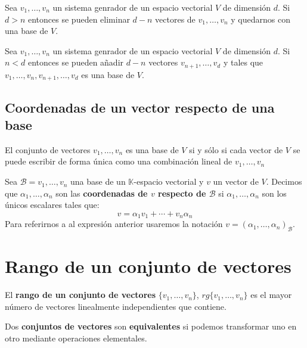 \begin{theorem}
	Sea ${v_1,\ldots,v_n}$ un sistema genrador de un espacio vectorial $V$ de dimensión $d$. Si $d>n$ entonces se pueden eliminar $d-n$ vectores de ${v_1,\ldots,v_n}$ y quedarnos con una base de $V$.
\end{theorem}

\begin{theorem}
	Sea ${v_1,\ldots,v_n}$ un sistema genrador de un espacio vectorial $V$ de dimensión $d$. Si $n<d$ entonces se pueden añadir $d-n$ vectores ${v_{n+1},\ldots,v_d}$ y tales que ${v_1,\ldots,v_n,v_{n+1},\ldots,v_d}$ es una base de $V$.
\end{theorem}

\subsection{Coordenadas de un vector respecto de una base}

\begin{theorem}
	El conjunto de vectores ${v_{1},\ldots,v_n}$ es una base de $V$ si y sólo si cada vector de $V$ se puede escribir de forma única como una combinación lineal de ${v_{1},\ldots,v_n}$
\end{theorem}

\begin{defi}
	Sea $\mathcal{B}={v_{1},\ldots,v_n}$ una base de un $\mathbb{K}$-espacio vectorial y $v$ un vector de $V$. Decimos que ${\alpha_{1},\ldots,\alpha_n}$ son las \textbf{coordenadas de $v$ respecto de $\mathcal{B}$} si $\alpha_{1},\ldots,\alpha_n$ son los únicos escalares tales que:
	\[
	v = \alpha_{1}v_1+\cdots+v_n\alpha_n
	\]
	Para referirnos a al expresión anterior usaremos la notación $v=(\alpha_{1},\ldots,\alpha_n)_{\mathcal{B}}$.
\end{defi}

\section{Rango de un conjunto de vectores}

\begin{defi}
	El \textbf{rango de un conjunto de vectores} $\{v_1,\ldots,v_n\}$, $rg\{v_1,\ldots,v_n\}$ es el mayor número de vectores linealmente independientes que contiene.
\end{defi}

\begin{defi}
	Dos \textbf{conjuntos de vectores} son \textbf{equivalentes} si podemos transformar uno en otro mediante operaciones elementales.
\end{defi}

